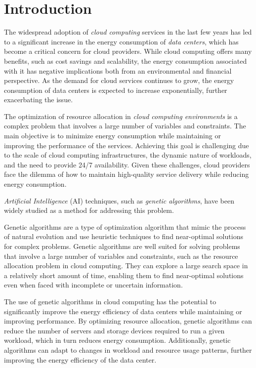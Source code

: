 \section{Introduction}\label{sect:intro}

The widespread adoption of \textit{cloud computing} services in the last few years has led to a significant increase in the energy consumption 
of \textit{data centers}, which has become a critical concern for cloud providers. 
While cloud computing offers many benefits, such as cost savings and scalability, 
the energy consumption associated with it has negative implications both from an environmental and financial perspective. 
As the demand for cloud services continues to grow, the energy consumption of data centers is expected to increase exponentially, 
further exacerbating the issue.

The optimization of resource allocation in \textit{cloud computing environments} is a complex problem that involves a large number of variables and constraints. 
The main objective is to minimize energy consumption while maintaining or improving the performance of the services. 
Achieving this goal is challenging due to the scale of cloud computing infrastructures, the dynamic nature of workloads, and the need to provide 24/7 availability. 
Given these challenges, cloud providers face the dilemma of how to maintain high-quality service delivery while reducing energy consumption.

\textit{Artificial Intelligence} (AI) techniques, such as \textit{genetic algorithms}, have been widely studied as a method for addressing this problem. 

Genetic algorithms are a type of optimization algorithm that mimic the process of natural evolution and use heuristic techniques to find near-optimal solutions 
for complex problems. Genetic algorithms are well suited for solving problems that involve a large number of variables and constraints, 
such as the resource allocation problem in cloud computing. They can explore a large search space in a relatively short amount of time, 
enabling them to find near-optimal solutions even when faced with incomplete or uncertain information.

The use of genetic algorithms in cloud computing has the potential to significantly improve the energy efficiency of data centers while maintaining or improving performance. 
By optimizing resource allocation, genetic algorithms can reduce the number of servers and storage devices required to run a given workload, 
which in turn reduces energy consumption. Additionally, genetic algorithms can adapt to changes in workload and resource usage patterns, 
further improving the energy efficiency of the data center.

